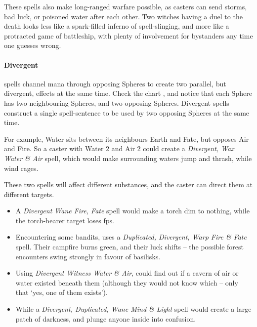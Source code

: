 \begin{multicols}{2}
\begin{exampletext}
  These spells also make long-ranged warfare possible, as casters can send storms, bad luck, or poisoned water after each other.
  Two witches having a duel to the death looks less like a spark-filled inferno of spell-slinging, and more like a protracted game of battleship, with plenty of involvement for bystanders any time one guesses wrong.
\end{exampletext}

\begin{figure*}[t!]
  \centering
  \speltogram
  \label{speltogram}
\end{figure*}

\paragraph{Divergent}
spells channel mana through opposing Spheres to create two parallel, but divergent, effects at the same time.
Check the chart , and notice that each Sphere has two neighbouring Spheres, and two opposing Spheres.
Divergent spells construct a single spell-sentence to be used by two opposing Spheres at the same time.

For example, Water sits between its neighbours Earth and Fate, but opposes Air and Fire.
So a caster with Water 2 and Air 2 could create a \textit{Divergent, Wax Water \& Air} spell, which would make surrounding waters jump and thrash, while wind rages.

These two spells will affect different substances, and the caster can direct them at different targets.

\begin{itemize}
  \item
  A \textit{Divergent Wane Fire, Fate} spell would make a torch dim to nothing, while the torch-bearer target loses \glspl{fp}.
  \item
  Encountering some bandits,  uses a \textit{Duplicated, Divergent, Warp Fire \& Fate} spell.
  Their campfire burns green, and their luck shifts -- the possible forest encounters swing strongly in favour of basilisks.
  \item
  Using \textit{Divergent Witness Water \& Air},  could find out if a cavern of air or water existed beneath them (although they would not know which -- only that `yes, one of them exists').
  \item
  While a \textit{Divergent, Duplicated, Wane Mind \& Light} spell would create a large patch of darkness, and plunge anyone inside into confusion.
\end{itemize}


\end{multicols}
